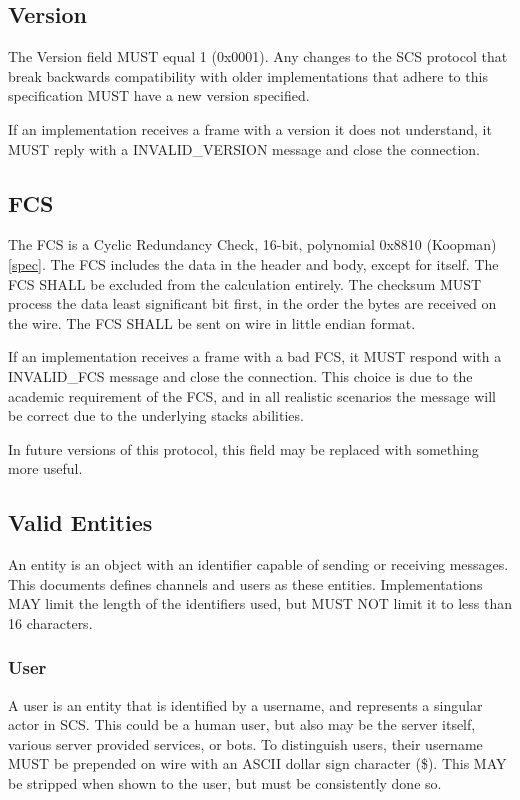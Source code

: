 \documentclass[12pt]{article}
\begin{document}
\subsection{Version}
The Version field MUST equal 1 (0x0001). Any changes to the SCS protocol that
break backwards compatibility with older implementations that adhere to this
specification MUST have a new version specified.

If an implementation receives a
frame with a version it does not understand, it MUST reply with a
INVALID\_VERSION message and close the connection.
\subsection{FCS}
The FCS is a Cyclic Redundancy Check, 16-bit, polynomial 0x8810 (Koopman)
\href{https://users.ece.cmu.edu/~koopman/crc/c16/0x8810.txt}{[spec]}.
The FCS includes the data in the header and body, except for itself. 
The FCS SHALL be excluded from the calculation entirely. The checksum MUST process the data least significant
bit first, in the order the bytes are received on the wire. The FCS SHALL be
sent on wire in little endian format. 

If an implementation receives a frame with
a bad FCS, it MUST respond with a INVALID\_FCS message and close the connection. This
choice is due to the academic requirement of the FCS, and in all realistic
scenarios the message will be correct due to the underlying stacks abilities.

In future versions of this protocol, this field may be replaced with something
more useful.

\subsection{Valid Entities}
An entity is an object with an identifier capable of sending or receiving
messages. This documents defines channels and users as these entities.
Implementations MAY limit the length of the identifiers used, but MUST NOT limit
it to less than 16 characters.
\subsubsection{User}
A user is an entity that is identified by a username, and represents a singular
actor in SCS. This could be a human user, but also may be the server itself,
various server provided services, or bots. To distinguish users, their username
MUST be prepended on wire with an ASCII dollar sign character (\$). This MAY be
stripped when shown to the user, but must be consistently done so.
\end{document}
